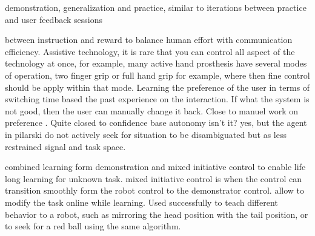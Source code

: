 \cite{nicolescu2003natural} demonstration, generalization and practice, similar to iterations between practice and user feedback sessions \cite{judah2010reinforcement}


\cite{pilarski2012between} between instruction and reward to balance human effort with communication efficiency. Assistive technology, it is rare that you can control all aspect of the technology at once, for example, many active hand prosthesis have several modes of operation, two finger grip or full hand grip for example, where then fine control should be apply within that mode. Learning the preference of the user in terms of switching time based the past experience on the interaction. If what the system is not good, then the user can manually change it back. Close to manuel work on preference \cite{Mason2011}. Quite closed to confidence base autonomy isn't it? \cite{chernova09jair} yes, but the agent in pilarski do not actively seek for situation to be disambiguated but as less restrained signal and task space.

\cite{grollman2007dogged} combined learning form demonstration and mixed initiative control to enable life long learning for unknown task. mixed initiative control is when the control can transition smoothly form the robot control to the demonstrator control. allow to modify the task online while learning. Used successfully to teach different behavior to a robot, such as mirroring the head position with the tail position, or to seek for a red ball using the same algorithm.


